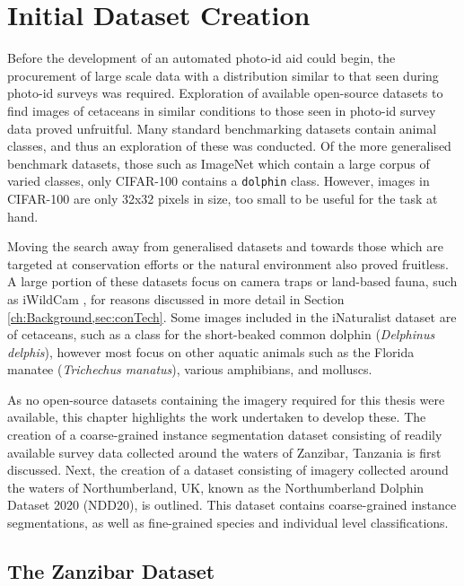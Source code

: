 \chapter{Initial Dataset Creation}\label{ch:datasetCreation}

Before the development of an automated photo-id aid could begin, the procurement of large scale data with a distribution similar to that seen during photo-id surveys was required. Exploration of available open-source datasets to find images of cetaceans in similar conditions to those seen in photo-id survey data proved unfruitful. Many standard benchmarking datasets contain animal classes, and thus an exploration of these was conducted. Of the more generalised benchmark datasets, those such as ImageNet \cite{deng_imagenet:_2009} which contain a large corpus of varied classes, only CIFAR-100 \cite{krizhevsky_learning_2009} contains a \texttt{dolphin} class. However, images in CIFAR-100 are only 32x32 pixels in size, too small to be useful for the task at hand. 

Moving the search away from generalised datasets and towards those which are targeted at conservation efforts or the natural environment also proved fruitless. A large portion of these datasets focus on camera traps or land-based fauna, such as iWildCam \cite{beery_iwildcam_2019}, for reasons discussed in more detail in Section \ref{ch:Background,sec:conTech}. Some images included in the iNaturalist dataset \cite{van_horn_inaturalist_2018} are of cetaceans, such as a class for the short-beaked common dolphin (\textit{Delphinus delphis}), however most focus on other aquatic animals such as the Florida manatee (\textit{Trichechus manatus}), various amphibians, and molluscs. 

As no open-source datasets containing the imagery required for this thesis were available, this chapter highlights the work undertaken to develop these. The creation of a coarse-grained instance segmentation dataset consisting of readily available survey data collected around the waters of Zanzibar, Tanzania is first discussed. Next, the creation of a dataset consisting of imagery collected around the waters of Northumberland, UK, known as the Northumberland Dolphin Dataset 2020 (NDD20), is outlined. This dataset contains coarse-grained instance segmentations, as well as fine-grained species and individual level classifications. 

\section{The Zanzibar Dataset}\label{ch:datasetCreation,sec:zanzibar}

